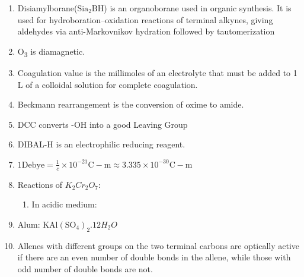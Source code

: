 \documentclass{article}
\numberwithin{equation}{section}
\numberwithin{figure}{section}
\newcommand{\Sub}[1]{\textsubscript{#1}}
\begin{document}
\begin{enumerate}
\begin{enumerate}
		\end{enumerate}
	\item Disiamylborane($\mathrm{Sia_2BH}$) is an organoborane used in organic synthesis. It is used for hydroboration–oxidation reactions of terminal alkynes, giving aldehydes via anti-Markovnikov hydration followed by tautomerization
	\item O\Sub{3} is diamagnetic.
	\item Coagulation value is the millimoles of an electrolyte that must be added to 1 L of a colloidal solution for complete coagulation. 
	\item Beckmann rearrangement is the conversion of oxime to amide.
	\item DCC converts -OH into a good Leaving Group
	\item DIBAL-H is an electrophilic reducing reagent.
	\item $1 \mathrm{Debye}= \frac{1}{c}\times 10^{-21} \mathrm{C-m}\approx 3.335 \times 10^{-30}\mathrm{C-m}$
	\item Reactions of $K_2 Cr_2 O_7$:
		\begin{enumerate}
			\item In acidic medium: 
		\end{enumerate}
	\item Alum: $\mathrm{KAl(SO_4)_2}.12H_2 O$
	\item Allenes with different groups on the two terminal carbons are optically active if there are an even number of double bonds in the allene, while those with odd number of double bonds are not.
\end{enumerate}
\end{document}

